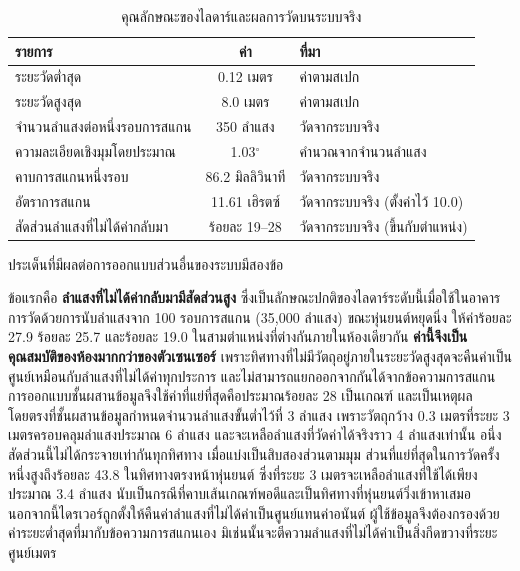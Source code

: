 \documentclass[a4paper,12pt]{report}
\begin{document}
\begin{table}[htbp]
\centering
\caption[คุณลักษณะของไลดาร์และผลการวัดบนระบบจริง (บทที่ 4)]{คุณลักษณะของไลดาร์และผลการวัดบนระบบจริง}
\label{tab:lidar}
\small
\begin{tabularx}{\textwidth}{|X|c|>{\raggedright\arraybackslash}p{3.6cm}|}
\hline
\textbf{รายการ} & \textbf{ค่า} & \textbf{ที่มา} \\
\hline
ระยะวัดต่ำสุด & 0.12 เมตร & ค่าตามสเปก \\
\hline
ระยะวัดสูงสุด & 8.0 เมตร & ค่าตามสเปก \\
\hline
จำนวนลำแสงต่อหนึ่งรอบการสแกน & 350 ลำแสง & วัดจากระบบจริง \\
\hline
ความละเอียดเชิงมุมโดยประมาณ & 1.03$^\circ$ & คำนวณจากจำนวนลำแสง \\
\hline
คาบการสแกนหนึ่งรอบ & 86.2 มิลลิวินาที & วัดจากระบบจริง \\
\hline
อัตราการสแกน & 11.61 เฮิรตซ์ & วัดจากระบบจริง (ตั้งค่าไว้ 10.0) \\
\hline
สัดส่วนลำแสงที่ไม่ได้ค่ากลับมา & ร้อยละ 19--28 & วัดจากระบบจริง (ขึ้นกับตำแหน่ง) \\
\hline
\end{tabularx}
\end{table}

ประเด็นที่มีผลต่อการออกแบบส่วนอื่นของระบบมีสองข้อ

ข้อแรกคือ \textbf{ลำแสงที่ไม่ได้ค่ากลับมามีสัดส่วนสูง}
ซึ่งเป็นลักษณะปกติของไลดาร์ระดับนี้เมื่อใช้ในอาคาร
การวัดด้วยการนับลำแสงจาก 100 รอบการสแกน (35{,}000 ลำแสง) ขณะหุ่นยนต์หยุดนิ่ง
ให้ค่าร้อยละ 27.9 ร้อยละ 25.7 และร้อยละ 19.0 ในสามตำแหน่งที่ต่างกันภายในห้องเดียวกัน
\textbf{ค่านี้จึงเป็นคุณสมบัติของห้องมากกว่าของตัวเซนเซอร์}
เพราะทิศทางที่ไม่มีวัตถุอยู่ภายในระยะวัดสูงสุดจะคืนค่าเป็นศูนย์เหมือนกับลำแสงที่ไม่ได้ค่าทุกประการ
และไม่สามารถแยกออกจากกันได้จากข้อความการสแกน
การออกแบบชั้นผสานข้อมูลจึงใช้ค่าที่แย่ที่สุดคือประมาณร้อยละ 28 เป็นเกณฑ์
และเป็นเหตุผลโดยตรงที่ชั้นผสานข้อมูลกำหนดจำนวนลำแสงขั้นต่ำไว้ที่ 3 ลำแสง
เพราะวัตถุกว้าง 0.3 เมตรที่ระยะ 3 เมตรครอบคลุมลำแสงประมาณ 6 ลำแสง
และจะเหลือลำแสงที่วัดค่าได้จริงราว 4 ลำแสงเท่านั้น
อนึ่ง สัดส่วนนี้ไม่ได้กระจายเท่ากันทุกทิศทาง เมื่อแบ่งเป็นสิบสองส่วนตามมุม
ส่วนที่แย่ที่สุดในการวัดครั้งหนึ่งสูงถึงร้อยละ 43.8 ในทิศทางตรงหน้าหุ่นยนต์
ซึ่งที่ระยะ 3 เมตรจะเหลือลำแสงที่ใช้ได้เพียงประมาณ 3.4 ลำแสง
นับเป็นกรณีที่คาบเส้นเกณฑ์พอดีและเป็นทิศทางที่หุ่นยนต์วิ่งเข้าหาเสมอ
นอกจากนี้ไดรเวอร์ถูกตั้งให้คืนค่าลำแสงที่ไม่ได้ค่าเป็นศูนย์แทนค่าอนันต์
ผู้ใช้ข้อมูลจึงต้องกรองด้วยค่าระยะต่ำสุดที่มากับข้อความการสแกนเอง
มิเช่นนั้นจะตีความลำแสงที่ไม่ได้ค่าเป็นสิ่งกีดขวางที่ระยะศูนย์เมตร
\end{document}
